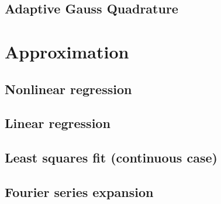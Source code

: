 \documentclass[article,A4,12pt]{llncs}
\begin{document}
\subsection{Adaptive Gauss Quadrature}



\section{Approximation}


\subsection{Nonlinear regression}


\subsection{Linear regression}

\subsection{Least squares fit (continuous case)}


\subsection{Fourier series expansion}
\end{document}

